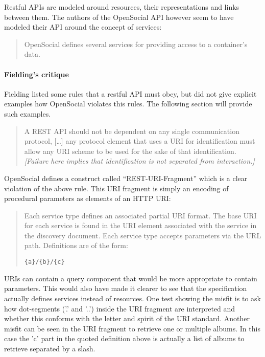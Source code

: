 \documentclass[12pt,a4paper]{scrartcl}		%
\begin{document}
Restful APIs are modeled around resources, their representations and links
between them. The authors of the OpenSocial API however seem to have modeled
their API around the concept of services:\cite[Social API Server, sec 2, Services]{OSSpec2.0.1}
\begin{quote}
  OpenSocial defines several services for providing access to a container's data.
\end{quote}

\paragraph{Fielding's critique}
Fielding listed some rules that a restful API must obey, but did not give
explicit examples how OpenSocial violates this rules. The following section will
provide such examples.

\begin{quote}
  A REST API should not be dependent on any single communication protocol,
  [\ldots] any protocol element that uses a URI for identification must allow
  any URI scheme to be used for the sake of that identification.
  \textit{[Failure here implies that identification is not separated from
    interaction.]}
\end{quote}

OpenSocial defines a construct called ``REST-URI-Fragment'' which is a clear
violation of the above rule. This URI fragment is simply an encoding of
procedural parameters as elements of an HTTP URI:\cite[Core API Server, sec
2.1.1.2.2, REST-URI-Fragment]{OSSpec2.0.1}

\begin{quote}
  Each service type defines an associated partial URI format. The base URI for
  each service is found in the URI element associated with the service in the
  discovery document. Each service type accepts parameters via the URL
  path. Definitions are of the form:
  
  \verb:{a}/{b}/{c}:
\end{quote}

URIs can contain a query component that would be more appropriate to contain
parameters. This would also have made it clearer to see that the specification
actually defines services instead of resources. One test showing the misfit is
to ask how dot-segments ('.' and '..') inside the URI fragment are interpreted
and whether this conforms with the letter and spirit of the URI
standard.\cite[sec 3.3]{RFC3986} Another misfit can be seen in the URI fragment
to retrieve one or multiple albums. In this case the 'c' part in the quoted
definition above is actually a list of albums to retrieve separated by a slash.
\end{document}
